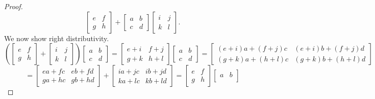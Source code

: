 \begin{proof}
\[    \begin{bmatrix}
        e & f \\
        g & h
    \end{bmatrix}
    +
    \begin{bmatrix}
        a & b \\
        c & d
    \end{bmatrix}
    \begin{bmatrix}
        i & j \\
        k & l
    \end{bmatrix}.
    \]
    We now show right distributivity.
    \[
    \left(
    \begin{bmatrix}
        e & f \\
        g & h
    \end{bmatrix}
    +
    \begin{bmatrix}
        i & j \\
        k & l
    \end{bmatrix}
    \right)
    \begin{bmatrix}
        a & b \\
        c & d
    \end{bmatrix}
    =
    \begin{bmatrix}
        e+i & f+j \\
        g+k & h+l
    \end{bmatrix}
    \begin{bmatrix}
        a & b \\
        c & d
    \end{bmatrix}
    =
    \begin{bmatrix}
        (e+i)a + (f+j)c & (e+i)b + (f+j)d \\
        (g+k)a + (h+l)c & (g+k)b + (h+l)d
    \end{bmatrix}
    \]
    \[
    =
    \begin{bmatrix}
        ea + fc & eb + fd \\
        ga + hc & gb + hd
    \end{bmatrix}
    +
    \begin{bmatrix}
        ia + jc & ib + jd \\
        ka + lc & kb + ld
    \end{bmatrix}
    =
    \begin{bmatrix}
        e & f \\
        g & h
    \end{bmatrix}
    \begin{bmatrix}
        a & b \\

\end{bmatrix}\]
\end{proof}
